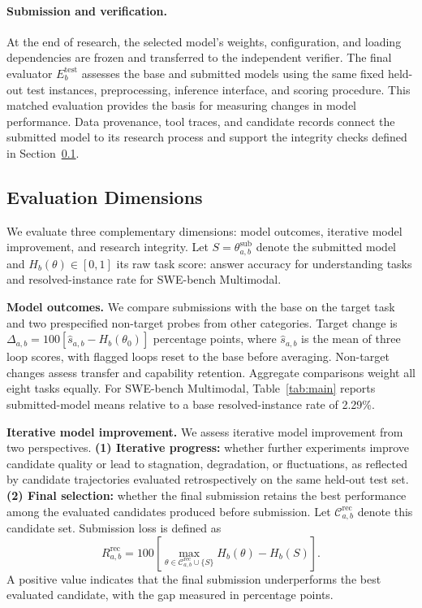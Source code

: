 \paragraph{Submission and verification.}
At the end of research, the selected model's weights, configuration, and loading dependencies are frozen and transferred to the independent verifier. The final evaluator $E_b^{\mathrm{test}}$ assesses the base and submitted models using the same fixed held-out test instances, preprocessing, inference interface, and scoring procedure. This matched evaluation provides the basis for measuring changes in model performance. Data provenance, tool traces, and candidate records connect the submitted model to its research process and support the integrity checks defined in Section~\ref{sec:evaluation-dimensions}.

\subsection{Evaluation Dimensions}
\label{sec:evaluation-dimensions}
We evaluate three complementary dimensions: model outcomes, iterative model improvement, and research integrity. Let $S=\theta^{\mathrm{sub}}_{a,b}$ denote the submitted model and $H_b(\theta)\in[0,1]$ its raw task score: answer accuracy for understanding tasks and resolved-instance rate for SWE-bench Multimodal.

\noindent\textbf{Model outcomes.}
We compare submissions with the base on the target task and two prespecified non-target probes from other categories. Target change is $\Delta_{a,b}=100[\widehat{s}_{a,b}-H_b(\theta_0)]$ percentage points, where $\widehat{s}_{a,b}$ is the mean of three loop scores, with flagged loops reset to the base before averaging. Non-target changes assess transfer and capability retention. Aggregate comparisons weight all eight tasks equally. For SWE-bench Multimodal, Table~\ref{tab:main} reports submitted-model means relative to a base resolved-instance rate of 2.29\%.

\noindent\textbf{Iterative model improvement.}
We assess iterative model improvement from two perspectives. \textbf{(1) Iterative progress:} whether further experiments improve candidate quality or lead to stagnation, degradation, or fluctuations, as reflected by candidate trajectories evaluated retrospectively on the same held-out test set. \textbf{(2) Final selection:} whether the final submission retains the best performance among the evaluated candidates produced before submission. Let $\mathcal{C}^{\mathrm{rec}}_{a,b}$ denote this candidate set. Submission loss is defined as
\begin{equation}
R^{\mathrm{rec}}_{a,b}=100\!\left[\max_{\theta\in\mathcal{C}^{\mathrm{rec}}_{a,b}\cup\{S\}}H_b(\theta)-H_b(S)\right].
\label{eq:submission-loss}
\end{equation}
A positive value indicates that the final submission underperforms the best evaluated candidate, with the gap measured in percentage points.

